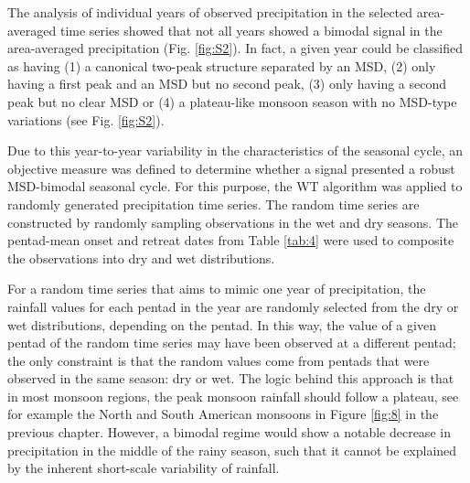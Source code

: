 The analysis of individual years of observed precipitation in the selected area-averaged time series showed that not all years showed a bimodal signal in the area-averaged precipitation (Fig. \ref{fig:S2}). In fact, a given year could be classified as having (1) a canonical two-peak structure separated by an MSD, (2) only having a first peak and an MSD but no second peak, (3) only having a second peak but no clear MSD or (4) a plateau-like monsoon season with no MSD-type variations (see Fig. \ref{fig:S2}). 


Due to this year-to-year variability in the characteristics of the seasonal cycle, an objective measure was defined to determine whether a signal presented a robust MSD-bimodal seasonal cycle.  
For this purpose, the WT algorithm was applied to randomly generated precipitation time series.
 The random time series are constructed by randomly sampling observations in the wet and dry seasons. 
 The pentad-mean onset and retreat dates from Table \ref{tab:4} were used to composite the observations into dry and wet distributions. 
 
 
 For a random time series that aims to mimic one year of precipitation, the rainfall values for each pentad in the year are randomly selected from the dry or wet distributions, depending on the pentad. In this way, the value of a given pentad of the random time series may have been observed at a different pentad; the only constraint is that the random values come from pentads that were observed in the same season: dry or wet. The logic behind this approach is that in most monsoon regions, the peak monsoon rainfall should follow a plateau, see for example the North and South American monsoons in Figure \ref{fig:8} in the previous chapter. However, a bimodal regime would show a notable decrease in precipitation in the middle of the rainy season, such that it cannot be explained by the inherent short-scale variability of rainfall. 
 
